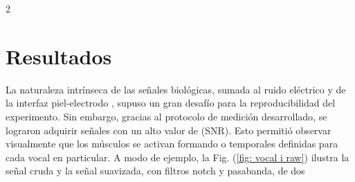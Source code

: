 \documentclass[11pt, letterpaper]{article}
\begin{document}
\begin{multicols*}{2}

\section{Resultados}

La naturaleza intrínseca de las señales biológicas, sumada al ruido eléctrico y de la interfaz piel-electrodo \cite{informeElectrodos2025}, supuso un gran desafío para la reproducibilidad del experimento. Sin embargo, gracias al protocolo de medición desarrollado, se lograron adquirir señales con un alto valor de (SNR). Esto permitió observar visualmente que los músculos se activan formando  o  temporales definidas para cada vocal en particular. A modo de ejemplo, la Fig. (\ref{fig: vocal i raw}) ilustra la señal cruda y la señal suavizada, con filtros notch y pasabanda, de dos


\end{multicols*}
\end{document}
